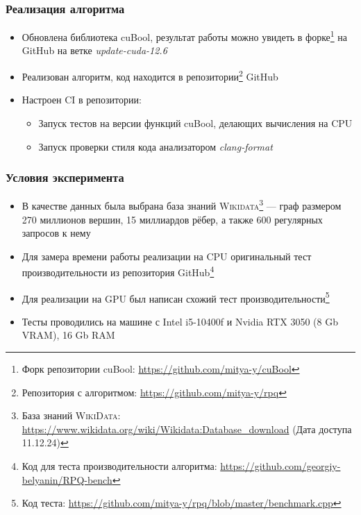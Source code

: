 \documentclass{beamer}
\begin{document}
\begin{frame}  
    \frametitle{Реализация алгоритма}

    \begin{itemize}
        \item Обновлена библиотека cuBool, результат работы можно увидеть в форке\footnote{Форк репозитории cuBool: \url{https://github.com/mitya-y/cuBool}} на GitHub на ветке \textit{update-cuda-12.6}
        
        \item Реализован алгоритм, код находится в репозитории\footnote{Репозитория с алгоритмом: \url{https://github.com/mitya-y/rpq}} GitHub
        
        \item Настроен CI в репозитории:
            \begin{itemize}
                \item Запуск тестов на версии функций cuBool, делающих вычисления на CPU
                \item Запуск проверки стиля кода анализатором \textit{clang-format}
            \end{itemize}
    \end{itemize}     
\end{frame}


\begin{frame}[t]
  \frametitle{Условия эксперимента}
  \begin{itemize}
    \item В качестве данных была выбрана база знаний \textsc{Wikidata}\footnote{База знаний \textsc{WikiData}: \href{https://www.wikidata.org/wiki/Wikidata:Database_download}{https://www.wikidata.org/wiki/Wikidata:Database\_download} (Дата доступа 11.12.24)} --- граф размером 270 миллионов вершин, 15 миллиардов
рёбер, а также 600 регулярных запросов к нему
    
    \item Для замера времени работы реализации на CPU оригинальный тест производительности из репозитория GitHub\footnote{Код для теста производительности алгоритма: \url{https://github.com/georgiy-belyanin/RPQ-bench}}
    
    \item Для реализации на GPU был написан схожий тест производительности\footnote{Код теста: \url{
    https://github.com/mitya-y/rpq/blob/master/benchmark.cpp}}
    
    \item Тесты проводились на машине с Intel i5-10400f и Nvidia RTX 3050 (8 Gb VRAM), 16 Gb RAM
  \end{itemize}  
\end{frame}
\end{document}
